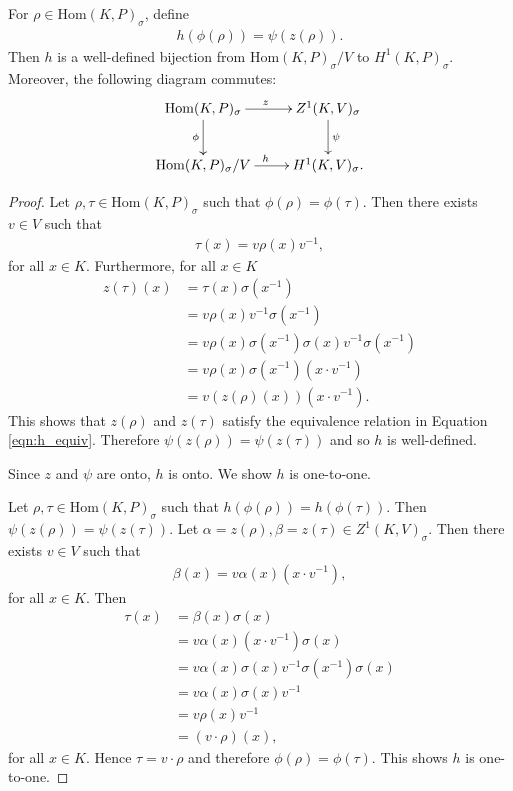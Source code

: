 \begin{lemma} \label{maph}
For $\rho \in \mathrm{Hom}(K, P)_\sigma$, define
\begin{align*}
h(\phi( \rho)) = \psi(z(\rho)).
\end{align*}
Then $h$ is a well-defined bijection from $\mathrm{Hom}(K, P)_\sigma / V$ to $H^1(K, P)_\sigma$. Moreover, the following diagram commutes:
  \begin{align*}
    \xymatrix{
    \mathrm{Hom}(K, P)_{\sigma} \ar[r]^z \ar[d]_\phi & Z^{1}(K, V)_\sigma \ar[d]^\psi \\
    \mathrm{Hom}(K, P)_{\sigma}/V \ar[r]^h & H^{1}(K, V)_\sigma.
    }
  \end{align*}
  \label{lem:v_h1}
\end{lemma}
\begin{proof}  
Let $\rho, \tau \in \mathrm{Hom}(K, P)_\sigma$ such that $\phi(\rho) = \phi(\tau)$. Then there exists $v \in V$ such that
\begin{align*} \tau(x) =  v\rho(x)v^{-1}, \end{align*}
for all $x \in K$. Furthermore, for all $x \in K$
\begin{align*}
z(\tau)(x) %
&= \tau(x)\sigma(x^{-1}) \\
&= v \rho(x) v^{-1} \sigma(x^{-1}) \\
&= v \rho(x) \sigma(x^{-1})\sigma(x) v^{-1} \sigma(x^{-1}) \\
&= v \rho(x) \sigma(x^{-1}) \left(x \cdot v^{-1}\right) \\
&= v \left(z(\rho)(x)\right) \left(x \cdot v^{-1}\right).
\end{align*}
This shows that $z(\rho)$ and $z(\tau)$ satisfy the equivalence relation in Equation \ref{eqn:h_equiv}. Therefore $\psi\left(z(\rho)\right) = \psi\left(z(\tau)\right)$ and so $h$ is well-defined.

Since $z$ and $\psi$ are onto, $h$ is onto. We show $h$ is one-to-one.

Let $\rho, \tau\in \mathrm{Hom}(K, P)_\sigma$ such that $h(\phi(\rho)) = h(\phi(\tau))$. Then $\psi(z(\rho)) = \psi(z(\tau))$.
Let $\alpha = z(\rho), \beta = z(\tau) \in Z^1(K, V)_\sigma$. Then there exists $v \in V$ such that
\begin{align*} \beta(x) = v \alpha(x) \left(x \cdot v^{-1}\right), \end{align*}
for all $x \in K$. Then
\begin{align*}
\tau(x) 
&= \beta(x)\sigma(x) \\
&= v \alpha(x) \left(x \cdot v^{-1}\right) \sigma(x) \\
&= v \alpha(x) \sigma(x) v^{-1} \sigma(x^{-1}) \sigma(x) \\
&= v \alpha(x) \sigma(x) v^{-1} \\
&= v \rho(x) v^{-1} \\
&= (v \cdot \rho)(x),
\end{align*}
for all $x \in K$. Hence $\tau = v\cdot \rho$ and therefore $\phi\left(\rho\right) = \phi\left(\tau\right)$. This shows $h$ is one-to-one.
\end{proof}

